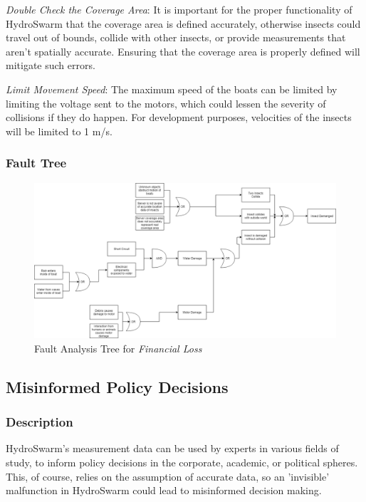 \documentclass[11pt]{article}
\begin{document}
\textit{Double Check the Coverage Area}: It is important for the proper functionality of HydroSwarm
that the coverage area is defined accurately, otherwise insects could travel out of bounds,
collide with other insects, or provide measurements that aren't spatially accurate. Ensuring
that the coverage area is properly defined will mitigate such errors.

\textit{Limit Movement Speed}: The maximum speed of the boats can be limited by limiting the voltage
sent to the motors, which could lessen the severity of collisions if they do happen. For development
purposes, velocities of the insects will be limited to 1 m/s.

\subsubsection*{Fault Tree}
\begin{figure}[H]
   \centering
   \includegraphics[width=1\textwidth]{Diagrams/Fault Tree - Financial Loss.png} %
   \caption{Fault Analysis Tree for \textit{Financial Loss}}
   \label{fig:ft-Air}
\end{figure}

\subsection{Misinformed Policy Decisions}
\subsubsection*{Description}
HydroSwarm's measurement data can be used by experts in various fields of study, to inform
policy decisions in the corporate, academic, or political spheres. This, of course, relies on
the assumption of accurate data, so an 'invisible' malfunction in HydroSwarm could lead to
misinformed decision making.
\end{document}
